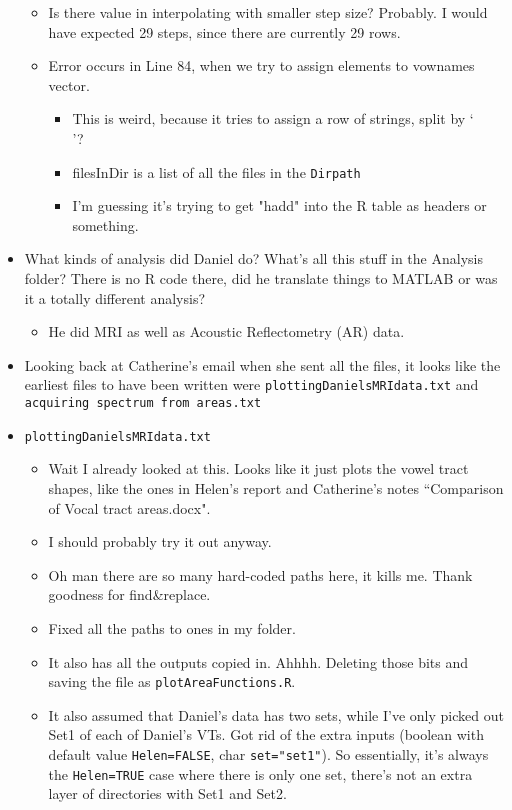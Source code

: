 \documentclass{article}
\begin{document}
\begin{itemize}
\begin{itemize}
        \item Is there value in interpolating with smaller step size? Probably. I would have expected 29 steps, since there are currently 29 rows. 
        \item Error occurs in Line 84, when we try to assign elements to vownames vector. 
        \begin{itemize}
            \item This is weird, because it tries to assign a row of strings, split by `\\'? 
            \item filesInDir is a list of all the files in the \verb|Dirpath|
            \item I'm guessing it's trying to get "hadd" into the R table as headers or something.
        \end{itemize}
    \end{itemize}
    \item What kinds of analysis did Daniel do? What's all this stuff in the Analysis folder? There is no R code there, did he translate things to MATLAB or was it a totally different analysis?
    \begin{itemize}
        \item He did MRI as well as Acoustic Reflectometry (AR) data.
    \end{itemize}
    \item Looking back at Catherine's email when she sent all the files, it looks like the earliest files to have been written were \verb|plottingDanielsMRIdata.txt| and \verb|acquiring spectrum from areas.txt|
    \item \verb|plottingDanielsMRIdata.txt|
    \begin{itemize}
        \item Wait I already looked at this. Looks like it just plots the vowel tract shapes, like the ones in Helen's report and Catherine's notes ``Comparison of Vocal tract areas.docx".
        \item I should probably try it out anyway.
        \item Oh man there are so many hard-coded paths here, it kills me. Thank goodness for find\&replace.
        \item Fixed all the paths to ones in my folder.
        \item It also has all the outputs copied in. Ahhhh. Deleting those bits and saving the file as \verb|plotAreaFunctions.R|.
        \item It also assumed that Daniel's data has two sets, while I've only picked out Set1 of each of Daniel's VTs. Got rid of the extra inputs (boolean with default value \verb|Helen=FALSE|, char \verb|set="set1"|). So essentially, it's always the \verb|Helen=TRUE| case where there is only one set, there's not an extra layer of directories with Set1 and Set2.

\end{itemize}
\end{itemize}
\end{document}
